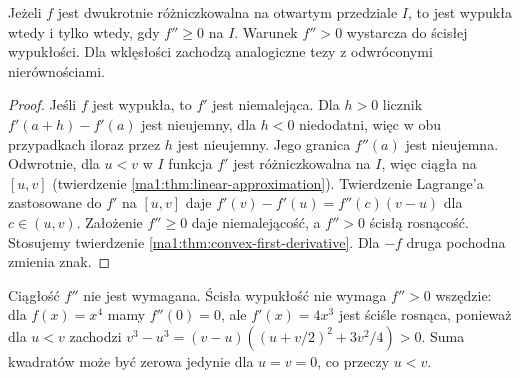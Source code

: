 \begin{twierdzenie}
\label{ma1:thm:convex-second-derivative}
Jeżeli $f$ jest dwukrotnie różniczkowalna na otwartym przedziale $I$, to jest wypukła wtedy i tylko wtedy, gdy $f''\ge0$ na $I$. Warunek $f''>0$ wystarcza do ścisłej wypukłości. Dla wklęsłości zachodzą analogiczne tezy z odwróconymi nierównościami.
\end{twierdzenie}
\begin{proof}
Jeśli $f$ jest wypukła, to $f'$ jest niemalejąca. Dla $h>0$ licznik $f'(a+h)-f'(a)$ jest nieujemny, dla $h<0$ niedodatni, więc w obu przypadkach iloraz przez $h$ jest nieujemny. Jego granica $f''(a)$ jest nieujemna. Odwrotnie, dla $u<v$ w $I$ funkcja $f'$ jest różniczkowalna na $I$, więc ciągła na $[u,v]$ (twierdzenie \ref{ma1:thm:linear-approximation}). Twierdzenie Lagrange'a zastosowane do $f'$ na $[u,v]$ daje $f'(v)-f'(u)=f''(c)(v-u)$ dla $c\in(u,v)$. Założenie $f''\ge0$ daje niemalejącość, a $f''>0$ ścisłą rosnącość. Stosujemy twierdzenie \ref{ma1:thm:convex-first-derivative}. Dla $-f$ druga pochodna zmienia znak.
\end{proof}
Ciągłość $f''$ nie jest wymagana. Ścisła wypukłość nie wymaga $f''>0$ wszędzie: dla $f(x)=x^4$ mamy $f''(0)=0$, ale $f'(x)=4x^3$ jest ściśle rosnąca, ponieważ dla $u<v$ zachodzi $v^3-u^3=(v-u)((u+v/2)^2+3v^2/4)>0$. Suma kwadratów może być zerowa jedynie dla $u=v=0$, co przeczy $u<v$.

